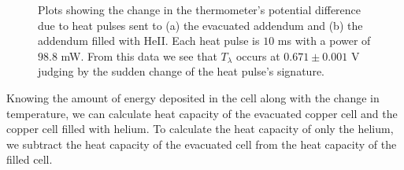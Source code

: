 \begin{figure}[htbp]
\begin{center}
\hspace{-1mm}
\vspace{-2mm}
\vspace{-2mm}
\caption{\small{Plots showing the change in the thermometer's potential difference due to heat pulses sent to (a) the evacuated addendum and (b) the addendum filled with HeII.  Each heat pulse is $10$ ms with a power of $98.8$ mW.  From this data we see that $T_{\lambda}$ occurs at $0.671 \pm 0.001$ V judging by the sudden change of the heat pulse's signature.}}
\label{fig:rawdata}
\end{center}
\end{figure}

Knowing the amount of energy deposited in the cell along with the change in temperature, we can calculate heat capacity of the evacuated copper cell and the copper cell filled with helium. To calculate the heat capacity of only the helium, we subtract the heat capacity of the evacuated cell from the heat capacity of the filled cell.